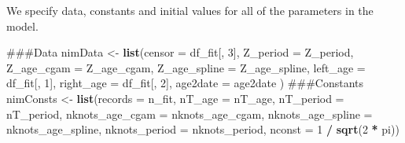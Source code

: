 \documentclass[11pt,]{article}
\newenvironment{Shaded}{\begin{snugshade}}{\end{snugshade}}
\newcommand{\KeywordTok}[1]{\textcolor[rgb]{0.13,0.29,0.53}{\textbf{#1}}}
\newcommand{\DataTypeTok}[1]{\textcolor[rgb]{0.13,0.29,0.53}{#1}}
\newcommand{\DecValTok}[1]{\textcolor[rgb]{0.00,0.00,0.81}{#1}}
\newcommand{\StringTok}[1]{\textcolor[rgb]{0.31,0.60,0.02}{#1}}
\newcommand{\OperatorTok}[1]{\textcolor[rgb]{0.81,0.36,0.00}{\textbf{#1}}}
\newcommand{\NormalTok}[1]{#1}
\begin{document}
We specify data, constants and initial values for all of the parameters
in the model.

\begin{Shaded}
\begin{Highlighting}[]
\NormalTok{###Data}
\NormalTok{nimData <-}\StringTok{ }\KeywordTok{list}\NormalTok{(}\DataTypeTok{censor =}\NormalTok{ df_fit[, }\DecValTok{3}\NormalTok{],}
                \DataTypeTok{Z_period =}\NormalTok{ Z_period,}
                \DataTypeTok{Z_age_cgam =}\NormalTok{ Z_age_cgam,}
                \DataTypeTok{Z_age_spline =}\NormalTok{ Z_age_spline,}
                \DataTypeTok{left_age =}\NormalTok{ df_fit[, }\DecValTok{1}\NormalTok{],}
                \DataTypeTok{right_age =}\NormalTok{ df_fit[, }\DecValTok{2}\NormalTok{],}
                \DataTypeTok{age2date =}\NormalTok{ age2date}
\NormalTok{                )}
\NormalTok{###Constants}
\NormalTok{nimConsts <-}\StringTok{ }\KeywordTok{list}\NormalTok{(}\DataTypeTok{records =}\NormalTok{ n_fit,}
                 \DataTypeTok{nT_age =}\NormalTok{ nT_age,}
                 \DataTypeTok{nT_period =}\NormalTok{ nT_period,}
                 \DataTypeTok{nknots_age_cgam =}\NormalTok{ nknots_age_cgam,}
                 \DataTypeTok{nknots_age_spline =}\NormalTok{ nknots_age_spline,}
                 \DataTypeTok{nknots_period =}\NormalTok{ nknots_period,}
                 \DataTypeTok{nconst =} \DecValTok{1} \OperatorTok{/}\StringTok{ }\KeywordTok{sqrt}\NormalTok{(}\DecValTok{2} \OperatorTok{*}\StringTok{ }\NormalTok{pi))}


\end{Highlighting}
\end{Shaded}
\end{document}
